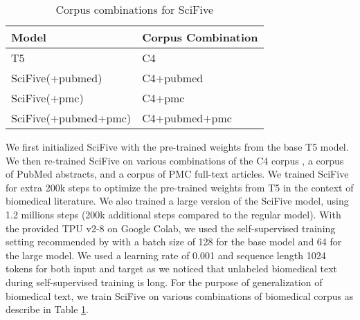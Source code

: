 \documentclass[nocrop]{bioinfo}
\begin{document}
\begin{methods}
\begin{table}[h]
\centering
\caption{Corpus combinations for SciFive}
\begin{tabular}{@{}ll@{}}
\toprule
Model                & Corpus Combination \\ \midrule
T5 \cite{DBLP:journals/corr/abs-1910-10683}                 & C4                 \\
SciFive(+pubmed)     & C4+pubmed          \\
SciFive(+pmc)        & C4+pmc             \\
SciFive(+pubmed+pmc) & C4+pubmed+pmc      \\ \bottomrule
\end{tabular}
\label{corpus_combination}
\end{table} We first initialized SciFive with the pre-trained weights from the base T5 model. We then re-trained SciFive on various combinations of the C4 corpus \citep{DBLP:journals/corr/abs-2104-08758}, a corpus of PubMed abstracts, and a corpus of PMC full-text articles. We trained SciFive for extra 200k steps to optimize the pre-trained weights from T5 in the context of biomedical literature. We also trained a large version of the SciFive model, using 1.2 millions steps (200k additional steps compared to the regular model). With the provided TPU v2-8 on Google Colab, we used the self-supervised training setting recommended by \cite{DBLP:journals/corr/abs-1910-10683} with a batch size of 128 for the base model and 64 for the large model. We used a learning rate of 0.001 and sequence length 1024 tokens for both input and target as we noticed that unlabeled biomedical text during self-supervised training is long. For the purpose of generalization of biomedical text, we train SciFive on various combinations of biomedical corpus as describe in Table \ref{corpus_combination}.



\end{methods}
\end{document}
